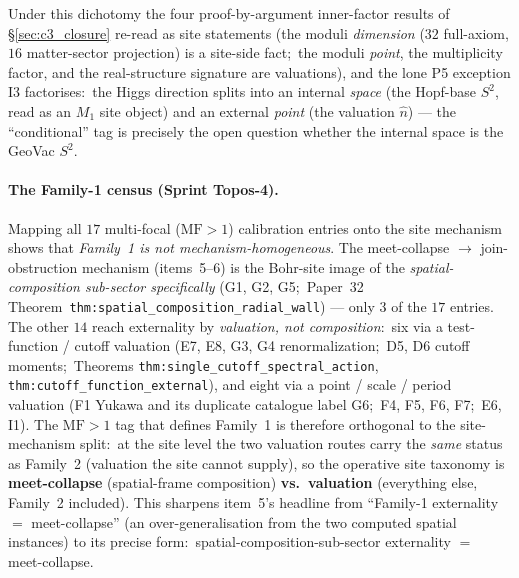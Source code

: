 \documentclass[11pt,a4paper]{article}
\theoremstyle{plain}
\theoremstyle{definition}
\begin{document}
Under this dichotomy the four proof-by-argument inner-factor results of
\S\ref{sec:c3_closure} re-read as site statements (the moduli
\emph{dimension} ($32$ full-axiom, $16$ matter-sector projection) is a site-side fact;\ the moduli
\emph{point}, the multiplicity factor, and the real-structure
signature are valuations), and the lone P5 exception I3 factorises:\
the Higgs direction splits into an internal \emph{space} (the
Hopf-base $S^2$, read as an $M_1$ site object) and an external \emph{point}
(the valuation $\hat n$) --- the ``conditional'' tag is precisely the
open question whether the internal space is the GeoVac $S^2$.

\paragraph{The Family-1 census (Sprint Topos-4).}  Mapping all $17$
multi-focal ($\mathrm{MF} > 1$) calibration entries onto the site
mechanism shows that \emph{Family~1 is not mechanism-homogeneous}.  The
meet-collapse $\to$ join-obstruction mechanism (items~5--6) is the
Bohr-site image of the \emph{spatial-composition sub-sector
specifically} (G1, G2, G5;\ Paper~32
Theorem~\texttt{thm:spatial\_composition\_radial\_wall}) --- only $3$
of the $17$ entries.  The other $14$ reach externality by
\emph{valuation, not composition}:\ six via a test-function / cutoff
valuation (E7, E8, G3, G4 renormalization;\ D5, D6 cutoff moments;\
Theorems \texttt{thm:single\_cutoff\_spectral\_action},
\texttt{thm:cutoff\_function\_external}), and eight via a point / scale
/ period valuation (F1 Yukawa and its duplicate catalogue label G6;\
F4, F5, F6, F7;\ E6, I1).  The
$\mathrm{MF} > 1$ tag that defines Family~1 is therefore orthogonal to
the site-mechanism split:\ at the site level the two valuation routes
carry the \emph{same} status as Family~2 (valuation the site cannot
supply), so the operative site taxonomy is \textbf{meet-collapse}
(spatial-frame composition) \textbf{vs.\ valuation} (everything else,
Family~2 included).  This sharpens item~5's headline from ``Family-1
externality $=$ meet-collapse'' (an over-generalisation from the two
computed spatial instances) to its precise form:\
spatial-composition-sub-sector externality $=$ meet-collapse.
\end{document}
